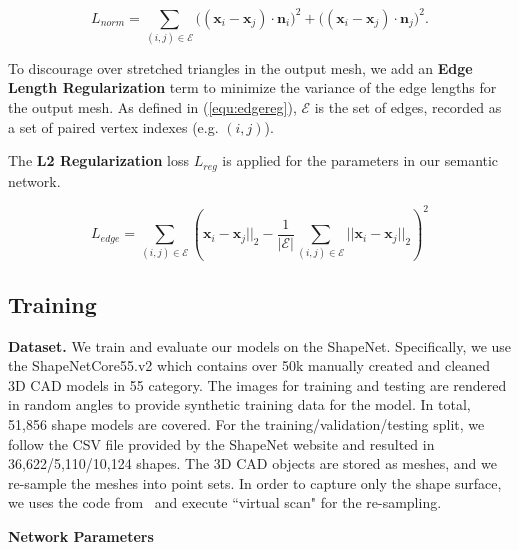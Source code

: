 \begin{equation}
\label{equ:norm}
L_{norm} = \sum_{(i,j)\in\mathcal{E}}\big((\mathbf{x}_i-\mathbf{x}_j)\cdot\mathbf{n}_{i}\big)^2 + \big( (\mathbf{x}_i-\mathbf{x}_j)\cdot \mathbf{n}_j\big)^2.
\end{equation}

To discourage over stretched triangles in the output mesh, we add an \textbf{Edge Length Regularization} term to minimize the variance of the edge lengths for the output mesh.
As defined in (\ref{equ:edgereg}), $\mathcal{E}$ is the set of edges, recorded as a set of paired vertex indexes (e.g. $(i,j)$).

The \textbf{L2 Regularization} loss $L_{reg}$ is applied for the parameters in our semantic network. 


\begin{equation}
\label{equ:edgereg}
L_{edge} = \sum_{(i,j)\in\mathcal{E}}(\mathbf{x}_i-\mathbf{x}_j||_2 - \frac{1}{|\mathcal{E}|}\sum_{(i,j)\in\mathcal{E} }||\mathbf{x}_i-\mathbf{x}_j||_2)^2
\end{equation}



\subsection{Training} 

\noindent \textbf{Dataset.}
We train and evaluate our models on the ShapeNet\cite{shapenetdata}. Specifically, we use the ShapeNetCore55.v2 which contains over 50k manually created and cleaned 3D CAD models in 55 category.
The images for training and testing are rendered in random angles to provide synthetic training data for the model. 
In total, 51,856 shape models are covered. 
For the training/validation/testing split, we follow the CSV file provided by the ShapeNet website and resulted in 36,622/5,110/10,124 shapes. 
The 3D CAD objects are stored as meshes, and we re-sample the meshes into point sets. 
In order to capture only the shape surface, we uses the code from~\cite{ocnn} and execute ``virtual scan" for the re-sampling.

\noindent \textbf{Network Parameters}


